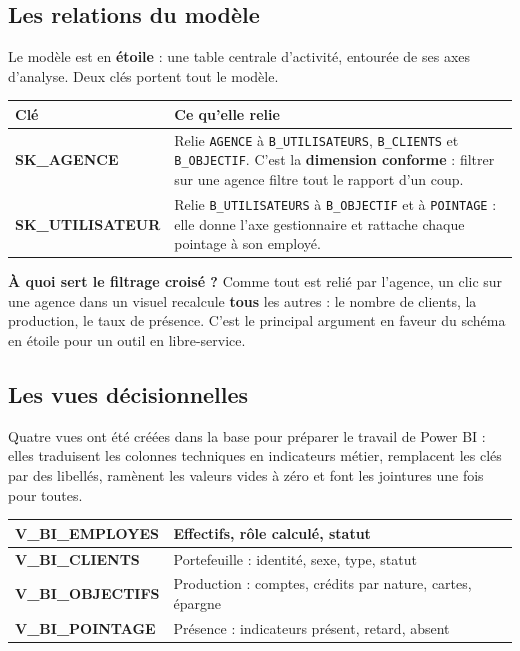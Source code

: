\documentclass[a4paper,11pt]{article}
\begin{document}
\subsection{Les relations du modèle}

Le modèle est en \textbf{étoile} : une table centrale d'activité, entourée de
ses axes d'analyse. Deux clés portent tout le modèle.

\noindent\begin{tabularx}{\textwidth}{|>{\bfseries}L{4cm}|X|}
\hline
\textmd{\textbf{Clé}} & \textbf{Ce qu'elle relie}\\
\hline
SK\_AGENCE & Relie \texttt{AGENCE} à \texttt{B\_UTILISATEURS}, \texttt{B\_CLIENTS} et \texttt{B\_OBJECTIF}. C'est la \textbf{dimension conforme} : filtrer sur une agence filtre tout le rapport d'un coup.\\
\hline
SK\_UTILISATEUR & Relie \texttt{B\_UTILISATEURS} à \texttt{B\_OBJECTIF} et à \texttt{POINTAGE} : elle donne l'axe gestionnaire et rattache chaque pointage à son employé.\\
\hline
\end{tabularx}

\begin{retenir}
\textbf{À quoi sert le filtrage croisé ?} Comme tout est relié par l'agence, un
clic sur une agence dans un visuel recalcule \textbf{tous} les autres : le
nombre de clients, la production, le taux de présence. C'est le principal
argument en faveur du schéma en étoile pour un outil en libre-service.
\end{retenir}

\subsection{Les vues décisionnelles}

Quatre vues ont été créées dans la base pour préparer le travail de Power BI :
elles traduisent les colonnes techniques en indicateurs métier, remplacent les
clés par des libellés, ramènent les valeurs vides à zéro et font les jointures
une fois pour toutes.

\noindent\begin{tabularx}{\textwidth}{|>{\bfseries}L{4cm}|X|}
\hline
V\_BI\_EMPLOYES & Effectifs, rôle calculé, statut\\
\hline
V\_BI\_CLIENTS & Portefeuille : identité, sexe, type, statut\\
\hline
V\_BI\_OBJECTIFS & Production : comptes, crédits par nature, cartes, épargne\\
\hline
V\_BI\_POINTAGE & Présence : indicateurs présent, retard, absent\\
\hline
\end{tabularx}
\end{document}
